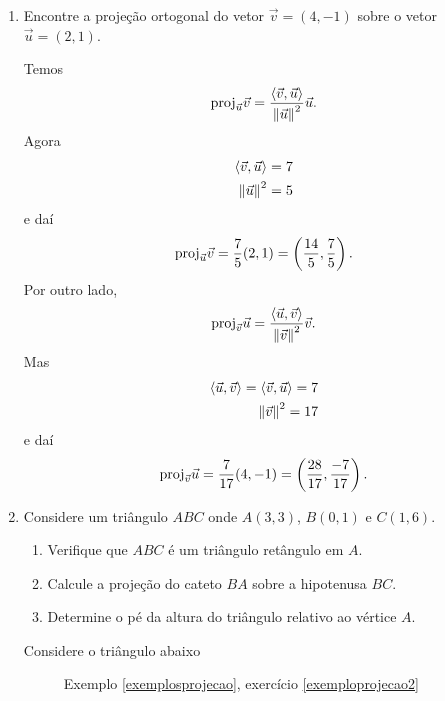 \begin{exemplos}\label{exemplosprojecao}
    \begin{enumerate}
        \item Encontre a projeção ortogonal do vetor $\vec{v} = (4, -1)$ sobre o vetor $\vec{u} = (2, 1)$.
              \begin{solucao}
                  Temos
                  \[
                      {\rm proj}_{\vec{u}}\vec{v} = \dfrac{\langle \vec{v}, \vec{u} \rangle}{\left\Vert{\vec{u}}\right\Vert^2}\vec{u}.
                  \]
                  Agora
                  \begin{align*}
                      \langle \vec{v}, \vec{u} \rangle = 7 \\
                      \left\Vert{\vec{u}}\right\Vert^2 = 5
                  \end{align*}
                  e daí
                  \[
                      {\rm proj}_{\vec{u}}\vec{v} = \dfrac{7}{5}(2, 1) = \left(\dfrac{14}{5}, \dfrac{7}{5}\right).
                  \]
                  Por outro lado,
                  \[
                      {\rm proj}_{\vec{v}}\vec{u} = \dfrac{\langle \vec{u}, \vec{v} \rangle}{\left\Vert{\vec{v}}\right\Vert^2}\vec{v}.
                  \]
                  Mas
                  \begin{align*}
                      \langle \vec{u}, \vec{v} \rangle = \langle \vec{v}, \vec{u} \rangle = 7 \\
                      \left\Vert{\vec{v}}\right\Vert^2 = 17
                  \end{align*}
                  e daí
                  \[
                      {\rm proj}_{\vec{v}}\vec{u} = \dfrac{7}{17}(4, -1) = \left(\dfrac{28}{17}, \dfrac{-7}{17}\right).
                  \]
              \end{solucao}
        \item Considere um triângulo $ABC$ onde $A(3,3)$, $B(0,1)$ e $C(1,6)$.
              \begin{enumerate}\label{exemploprojecao2}
                  \item Verifique que $ABC$ é um triângulo retângulo em $A$.
                  \item Calcule a projeção do cateto $BA$ sobre a hipotenusa $BC$.
                  \item Determine o pé da altura do triângulo relativo ao vértice $A$.
              \end{enumerate}
              \begin{solucao}
                  Considere o triângulo abaixo
                  \begin{figure}[H]
                      \centering
                      \caption{Exemplo \ref{exemplosprojecao}, exercício \ref{exemploprojecao2}}

\end{figure}
\end{solucao}
\end{enumerate}
\end{exemplos}
